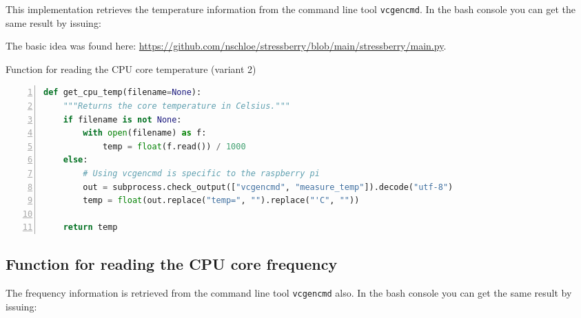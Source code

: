 \documentclass[10pt,parskip=half,
toc=sectionentrywithdots,
bibliography=totocnumbered,
captions=tableheading,numbers=noendperiod]{scrartcl}
\newenvironment{Shaded}{}{}
\newcommand{\NormalTok}[1]{{#1}}
\newcommand{\ExtensionTok}[1]{{#1}}
\begin{document}
This implementation retrieves the temperature information from the
command line tool \texttt{vcgencmd}. In the bash console you can get the
same result by issuing:

\begin{mdframed}

\begin{Shaded}
\end{Shaded}

\end{mdframed}

The basic idea was found here:
\url{https://github.com/nschloe/stressberry/blob/main/stressberry/main.py}.

\begin{codecell}[H]
\caption{Function for reading the CPU core temperature (variant 2)}
\label{code:f_get_cpu_temp_2}
\begin{lstlisting}[language=Python,numbers=left,xleftmargin=20pt,xrightmargin=5pt,belowskip=5pt,aboveskip=5pt]
def get_cpu_temp(filename=None):
    """Returns the core temperature in Celsius."""
    if filename is not None:
        with open(filename) as f:
            temp = float(f.read()) / 1000
    else:
        # Using vcgencmd is specific to the raspberry pi
        out = subprocess.check_output(["vcgencmd", "measure_temp"]).decode("utf-8")
        temp = float(out.replace("temp=", "").replace("'C", ""))

    return temp
\end{lstlisting}\end{codecell}

\hypertarget{function-for-reading-the-cpu-core-frequency}{%
\subsection{Function for reading the CPU core
frequency}\label{function-for-reading-the-cpu-core-frequency}}

The frequency information is retrieved from the command line tool
\texttt{vcgencmd} also. In the bash console you can get the same result
by issuing:

\begin{mdframed}

\begin{Shaded}
\end{Shaded}

\end{mdframed}
\end{document}

